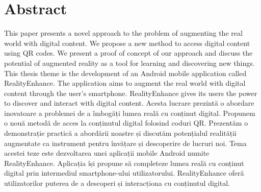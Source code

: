 \section*{Abstract}
This paper presents a novel approach to the problem of augmenting the real world with digital content. We propose a new method to access digital content using QR codes. We present a proof of concept of our approach and discuss the potential of augmented reality as a tool for learning and discovering new things.
This thesis theme is the development of an Android mobile application called RealityEnhance. The application aims to augment the real world with digital content through the user's smartphone. RealityEnhance gives its users the power to discover and interact with digital content.
\newline
\newline
Acesta lucrare prezintă o abordare inovatoare a problemei de a îmbogăți lumea reală cu conținut digital. Propunem o nouă metodă de acces la conținutul digital folosind coduri QR. Prezentăm o demonstrație practică a abordării noastre și discutăm potențialul realității augmentate ca instrument pentru învățare și descoperire de lucruri noi.
Tema acestei teze este dezvoltarea unei aplicații mobile Android numite RealityEnhance. Aplicația își propune să completeze lumea reală cu conținut digital prin intermediul smartphone-ului utilizatorului. RealityEnhance oferă utilizatorilor puterea de a descoperi și interacționa cu conținutul digital.